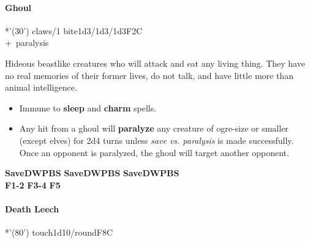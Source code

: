 \documentclass[english,11pt,openany,letterpaper,twocolumn]{book}
\begin{document}
\skipline
\hypertarget{ghoul}{}
\paragraph{Ghoul}
*'(30') claws/1 bite\tab 1d3/1d3/1d3\tab F2\tab C
\\+~paralysis

Hideous beastlike creatures who will attack and eat any living thing. They have no real memories of their former lives, do not talk, and have little more than animal intelligence.
\begin{itemize}[leftmargin=*,label=\itshape\textbullet]
\item
Immune to \textbf{sleep} and \textbf{charm} spells.
\item
Any hit from a ghoul will \textbf{paralyze} any creature of ogre-size or smaller (except elves) for 2d4 turns unless \emph{save vs. paralysis} is made successfully. Once an opponent is paralyzed, the ghoul will target another opponent.
\end{itemize}

\vfill


\overprintw[24\charwidth]{\_}%
\textbf{Save\tab D\tab W\tab P\tab B\tab S}\tab
\overprintw[24\charwidth]{\_}%
\textbf{Save\tab D\tab W\tab P\tab B\tab S}\tab
\overprintw[24\charwidth]{\_}%
\textbf{Save\tab D\tab W\tab P\tab B\tab S}\\
\textbf{F1-2}\tab
\textbf{F3-4}\tab
\textbf{F5}

\break

\setUndeadTabPositions{}

\hypertarget{leech}{}
\paragraph{Death Leech}
*'(80') touch\tab 1d10/round\tab F8\tab C
\end{document}
